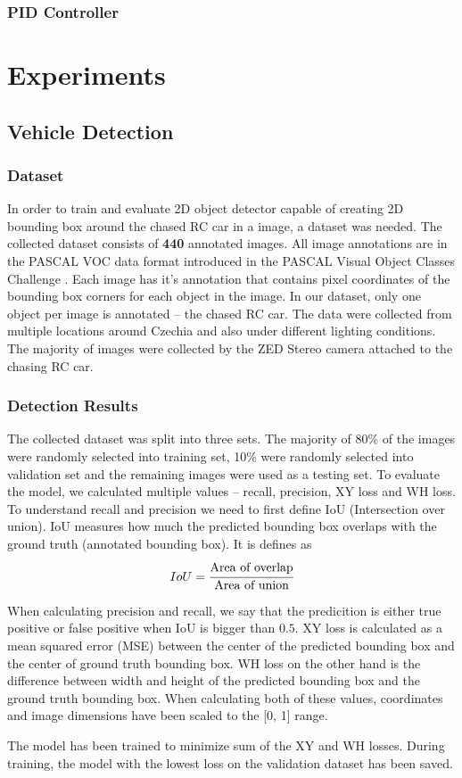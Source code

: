\subsection{PID Controller}

\chapter{Experiments}

\section{Vehicle Detection}
\subsection{Dataset}
In order to train and evaluate 2D object detector capable of creating 2D bounding box around the chased RC car in a image, a dataset was needed. The collected dataset consists of \textbf{440} annotated images. All image annotations are in the PASCAL VOC data format introduced in the PASCAL Visual Object Classes Challenge \cite{pascal-voc}. Each image has it's annotation that contains pixel coordinates of the bounding box corners for each object in the image. In our dataset, only one object per image is annotated -- the chased RC car. The data were collected from multiple locations around Czechia and also under different lighting conditions. The majority of images were collected by the ZED Stereo camera attached to the chasing RC car. 


\subsection{Detection Results}
The collected dataset was split into three sets. The majority of 80\% of the images were randomly selected into training set, 10\% were randomly selected into validation set and the remaining images were used as a testing set. To evaluate the model, we calculated multiple values -- recall, precision, XY loss and WH loss. To understand recall and precision we need to first define IoU (Intersection over union). IoU measures how much the predicted bounding box overlaps with the ground truth (annotated bounding box). It is defines as 
\begin{equation}IoU = \cfrac{\textrm{Area of overlap}}{\textrm{Area of union}}\end{equation}

When calculating precision and recall, we say that the predicition is either true positive or false positive when IoU is bigger than $0.5$. XY loss is calculated as a mean squared error (MSE) between the center of the predicted bounding box and the center of ground truth bounding box. WH loss on the other hand is the difference between width and height of the predicted bounding box and the ground truth bounding box. When calculating both of these values, coordinates and image dimensions have been scaled to the [0, 1] range. \par
The model has been trained to minimize sum of the XY and WH losses. During training, the model with the lowest loss on the validation dataset has been saved.

